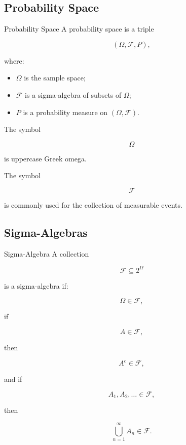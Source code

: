 \subsection{Probability Space}
\label{subsec:probability-space}

\begin{definitionbox}{Probability Space}
A probability space is a triple

\[
\boxed{
(\Omega,\mathcal{F},P),
}
\]

where:

\begin{itemize}
    \item \(\Omega\) is the sample space;
    \item \(\mathcal{F}\) is a sigma-algebra of subsets of \(\Omega\);
    \item \(P\) is a probability measure on \((\Omega,\mathcal{F})\).
\end{itemize}
\end{definitionbox}

The symbol

\[
\Omega
\]

is uppercase Greek omega.

The symbol

\[
\mathcal{F}
\]

is commonly used for the collection of measurable events.

\subsection{Sigma-Algebras}
\label{subsec:sigma-algebras-probability}

\begin{definitionbox}{Sigma-Algebra}
A collection

\[
\mathcal{F}
\subseteq
2^\Omega
\]

is a sigma-algebra if:

\[
\boxed{
\Omega\in\mathcal{F},
}
\]

if

\[
A\in\mathcal{F},
\]

then

\[
\boxed{
A^c\in\mathcal{F},
}
\]

and if

\[
A_1,A_2,\ldots\in\mathcal{F},
\]

then

\[
\boxed{
\bigcup_{n=1}^{\infty}A_n
\in
\mathcal{F}.
}
\]
\end{definitionbox}

